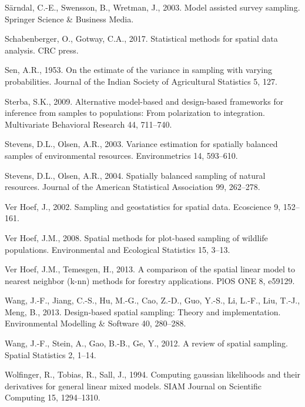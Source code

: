 \documentclass[]{elsarticle} %
\begin{document}
\leavevmode\hypertarget{ref-sarndal2003model}{}%
Särndal, C.-E., Swensson, B., Wretman, J., 2003. Model assisted survey
sampling. Springer Science \& Business Media.

\leavevmode\hypertarget{ref-schabenberger2017statistical}{}%
Schabenberger, O., Gotway, C.A., 2017. Statistical methods for spatial
data analysis. CRC press.

\leavevmode\hypertarget{ref-sen1953estimate}{}%
Sen, A.R., 1953. On the estimate of the variance in sampling with
varying probabilities. Journal of the Indian Society of Agricultural
Statistics 5, 127.

\leavevmode\hypertarget{ref-sterba2009alternative}{}%
Sterba, S.K., 2009. Alternative model-based and design-based frameworks
for inference from samples to populations: From polarization to
integration. Multivariate Behavioral Research 44, 711--740.

\leavevmode\hypertarget{ref-stevens2003variance}{}%
Stevens, D.L., Olsen, A.R., 2003. Variance estimation for spatially
balanced samples of environmental resources. Environmetrics 14,
593--610.

\leavevmode\hypertarget{ref-stevens2004spatially}{}%
Stevens, D.L., Olsen, A.R., 2004. Spatially balanced sampling of natural
resources. Journal of the American Statistical Association 99, 262--278.

\leavevmode\hypertarget{ref-verhoef2002sampling}{}%
Ver Hoef, J., 2002. Sampling and geostatistics for spatial data.
Ecoscience 9, 152--161.

\leavevmode\hypertarget{ref-verhoef2008spatial}{}%
Ver Hoef, J.M., 2008. Spatial methods for plot-based sampling of
wildlife populations. Environmental and Ecological Statistics 15, 3--13.

\leavevmode\hypertarget{ref-ver2013comparison}{}%
Ver Hoef, J.M., Temesgen, H., 2013. A comparison of the spatial linear
model to nearest neighbor (k-nn) methods for forestry applications. PlOS
ONE 8, e59129.

\leavevmode\hypertarget{ref-wang2013design}{}%
Wang, J.-F., Jiang, C.-S., Hu, M.-G., Cao, Z.-D., Guo, Y.-S., Li, L.-F.,
Liu, T.-J., Meng, B., 2013. Design-based spatial sampling: Theory and
implementation. Environmental Modelling \& Software 40, 280--288.

\leavevmode\hypertarget{ref-wang2012review}{}%
Wang, J.-F., Stein, A., Gao, B.-B., Ge, Y., 2012. A review of spatial
sampling. Spatial Statistics 2, 1--14.

\leavevmode\hypertarget{ref-wolfinger1994computing}{}%
Wolfinger, R., Tobias, R., Sall, J., 1994. Computing gaussian
likelihoods and their derivatives for general linear mixed models. SIAM
Journal on Scientific Computing 15, 1294--1310.
\end{document}
